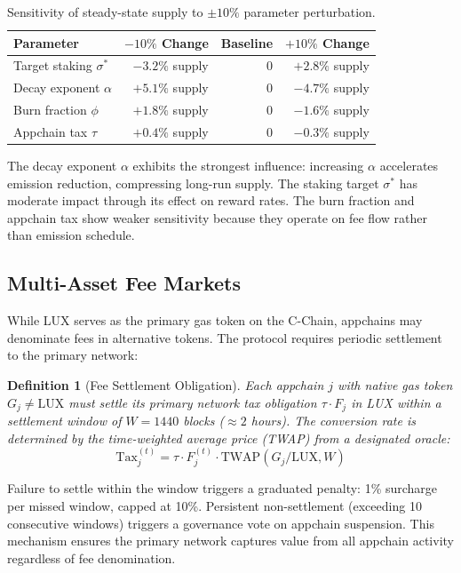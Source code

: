 \documentclass[11pt,a4paper]{article}
\newtheorem{definition}{Definition}
\begin{document}
\begin{table}[h]
\centering
\caption{Sensitivity of steady-state supply to $\pm 10\%$ parameter perturbation.}
\label{tab:sensitivity}
\begin{tabular}{lrrr}
\toprule
\textbf{Parameter} & \textbf{$-10\%$ Change} & \textbf{Baseline} & \textbf{$+10\%$ Change} \\
\midrule
Target staking $\sigma^*$ & $-3.2\%$ supply & 0 & $+2.8\%$ supply \\
Decay exponent $\alpha$ & $+5.1\%$ supply & 0 & $-4.7\%$ supply \\
Burn fraction $\phi$ & $+1.8\%$ supply & 0 & $-1.6\%$ supply \\
Appchain tax $\tau$ & $+0.4\%$ supply & 0 & $-0.3\%$ supply \\
\bottomrule
\end{tabular}
\end{table}

The decay exponent $\alpha$ exhibits the strongest influence: increasing $\alpha$ accelerates emission reduction, compressing long-run supply. The staking target $\sigma^*$ has moderate impact through its effect on reward rates. The burn fraction and appchain tax show weaker sensitivity because they operate on fee flow rather than emission schedule.

\subsection{Multi-Asset Fee Markets}

While LUX serves as the primary gas token on the C-Chain, appchains may denominate fees in alternative tokens. The protocol requires periodic settlement to the primary network:

\begin{definition}[Fee Settlement Obligation]
Each appchain $j$ with native gas token $G_j \neq \text{LUX}$ must settle its primary network tax obligation $\tau \cdot F_j$ in LUX within a settlement window of $W = 1440$ blocks ($\approx 2$ hours). The conversion rate is determined by the time-weighted average price (TWAP) from a designated oracle:
\begin{equation}
    \text{Tax}_j^{(t)} = \tau \cdot F_j^{(t)} \cdot \text{TWAP}(G_j/\text{LUX}, W)
\end{equation}
\end{definition}

Failure to settle within the window triggers a graduated penalty: 1\% surcharge per missed window, capped at 10\%. Persistent non-settlement (exceeding 10 consecutive windows) triggers a governance vote on appchain suspension. This mechanism ensures the primary network captures value from all appchain activity regardless of fee denomination.
\end{document}
